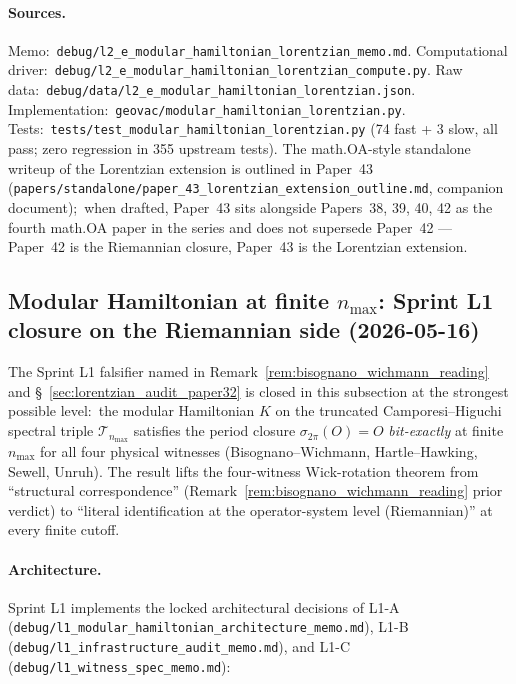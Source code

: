 \documentclass[11pt]{article}
\begin{document}
\paragraph{Sources.}
Memo:\ \verb|debug/l2_e_modular_hamiltonian_lorentzian_memo.md|.
Computational driver:\
\verb|debug/l2_e_modular_hamiltonian_lorentzian_compute.py|.
Raw data:\
\verb|debug/data/l2_e_modular_hamiltonian_lorentzian.json|.
Implementation:\
\verb|geovac/modular_hamiltonian_lorentzian.py|.
Tests:\
\verb|tests/test_modular_hamiltonian_lorentzian.py| (74 fast + 3 slow,
all pass; zero regression in 355 upstream tests).
The math.OA-style standalone writeup of the Lorentzian extension is
outlined in Paper~43 (\texttt{papers/standalone/paper\_43\_lorentzian\_extension\_outline.md},
companion document);\ when drafted, Paper~43 sits alongside Papers~38,
39, 40, 42 as the fourth math.OA paper in the series and does not
supersede Paper~42 — Paper~42 is the Riemannian closure, Paper~43 is
the Lorentzian extension.

\subsection{Modular Hamiltonian at finite $n_{\max}$: Sprint L1 closure
on the Riemannian side (2026-05-16)}
\label{sec:modular_hamiltonian_l1}

The Sprint L1 falsifier named in
Remark~\ref{rem:bisognano_wichmann_reading} and
\S~\ref{sec:lorentzian_audit_paper32} is closed in this subsection at
the strongest possible level:\ the modular Hamiltonian $K$ on the
truncated Camporesi--Higuchi spectral triple $\mathcal{T}_{n_{\max}}$
satisfies the period closure $\sigma_{2\pi}(O) = O$ \emph{bit-exactly}
at finite $n_{\max}$ for all four physical witnesses
(Bisognano--Wichmann, Hartle--Hawking, Sewell, Unruh).  The result
lifts the four-witness Wick-rotation theorem from ``structural
correspondence'' (Remark~\ref{rem:bisognano_wichmann_reading} prior
verdict) to ``literal identification at the operator-system level
(Riemannian)'' at every finite cutoff.

\paragraph{Architecture.}
Sprint L1 implements the locked architectural decisions of L1-A
(\texttt{debug/l1\_modular\_hamiltonian\_architecture\_memo.md}), L1-B
(\texttt{debug/l1\_infrastructure\_audit\_memo.md}), and L1-C
(\texttt{debug/l1\_witness\_spec\_memo.md}):
\end{document}
